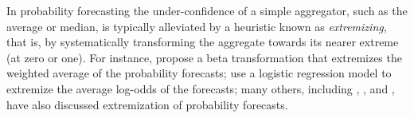 \documentclass[12pt]{article}
\theoremstyle{definition}
\theoremstyle{definition}
\begin{document}


In probability forecasting the under-confidence of a simple aggregator, such as the average or median, is typically alleviated by a heuristic known as \textit{extremizing}, that is, by systematically transforming the aggregate towards its nearer extreme (at zero or one). 
For instance, \cite{Ranjan08} propose a beta transformation that extremizes the weighted average of
  the probability forecasts; \cite{satopaa} use a logistic regression model to extremize the average log-odds of the
  forecasts; many others, including  \cite{shlomi2010subjective}, \cite{baron2014two}, and  \cite{mellers2014psychological}, have also discussed extremization of probability forecasts.
\end{document}
